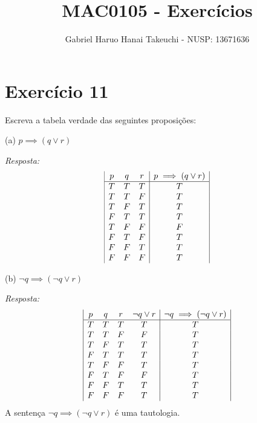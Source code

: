 \documentclass{article}
\author{Gabriel Haruo Hanai Takeuchi - NUSP: 13671636}
\title{MAC0105 - Exercícios}
\date{}
\begin{document}
\maketitle

\section*{Exercício 11}
Escreva a tabela verdade das seguintes proposições:

(a) $p \implies (q \lor r)$

\textit{Resposta:}
\begin{displaymath}
\begin{array}{|c c c|c|}
p & q  & r & p \implies (q \lor r)\\ %
\hline %
T & T & T & T\\
T & T & F & T\\
T & F & T & T\\
F & T & T & T\\
T & F & F & F\\
F & T & F & T\\
F & F & T & T\\
F & F & F & T\\
\end{array}
\end{displaymath}

(b) $\neg q \implies (\neg q \lor r)$

\textit{Resposta:}
\begin{displaymath}
\begin{array}{|c c c c|c|}
p & q  & r & \neg q \lor r & \neg q \implies (\neg q \lor r)\\
\hline
T & T & T & T & T\\
T & T & F & F & T\\
T & F & T & T & T\\
F & T & T & T & T\\
T & F & F & T & T\\
F & T & F & F & T\\
F & F & T & T & T\\
F & F & F & T & T\\
\end{array}
\end{displaymath}
A sentença $\neg q \implies (\neg q \lor r)$ é uma tautologia.
\end{document}
